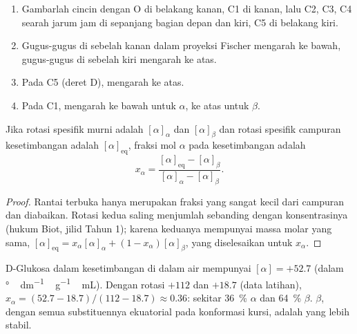 \begin{method}\label{met:b2:biomolecules:haworth}
\begin{enumerate}
  \item Gambarlah cincin dengan O di belakang kanan, C1 di kanan, lalu C2,
        C3, C4 searah jarum jam di sepanjang bagian depan dan kiri, C5 di
        belakang kiri.
  \item Gugus-gugus di sebelah kanan dalam proyeksi Fischer mengarah ke
        bawah, gugus-gugus di sebelah kiri mengarah ke atas.
  \item Pada C5 (deret D),  mengarah ke atas.
  \item Pada C1,  mengarah ke bawah untuk $\alpha$, ke atas untuk $\beta$.
\end{enumerate}
\end{method}

\begin{proposition}\label{prop:b2:biomolecules:mutarotation}
Jika rotasi spesifik  murni adalah $[\alpha]_\alpha$ dan
$[\alpha]_\beta$ dan rotasi spesifik campuran kesetimbangan adalah
$[\alpha]_{\mathrm{eq}}$, fraksi mol  $\alpha$ pada kesetimbangan
adalah
\begin{equation*}
x_\alpha = \frac{[\alpha]_{\mathrm{eq}} - [\alpha]_\beta}{[\alpha]_\alpha - [\alpha]_\beta}.
\end{equation*}
\end{proposition}

\begin{proof}
Rantai terbuka hanya merupakan fraksi yang sangat kecil dari campuran dan
diabaikan. Rotasi kedua  saling menjumlah sebanding dengan
konsentrasinya (hukum Biot, jilid Tahun 1); karena keduanya mempunyai massa
molar yang sama, $[\alpha]_{\mathrm{eq}} = x_\alpha[\alpha]_\alpha + (1 - x_\alpha)[\alpha]_\beta$,
yang diselesaikan untuk $x_\alpha$.
\end{proof}

D-Glukosa dalam kesetimbangan di dalam air mempunyai $[\alpha] = +52.7$ (dalam \unit{\degree\,dm^{-1}\,g^{-1}\,mL}).
Dengan rotasi  $+112$ dan $+18.7$ (data latihan), $x_\alpha = (52.7 - 18.7)/(112 - 18.7)
\approx 0.36$: sekitar 36~\% $\alpha$ dan 64~\% $\beta$.  $\beta$,
dengan semua substituennya ekuatorial pada konformasi kursi, adalah yang
lebih stabil.

